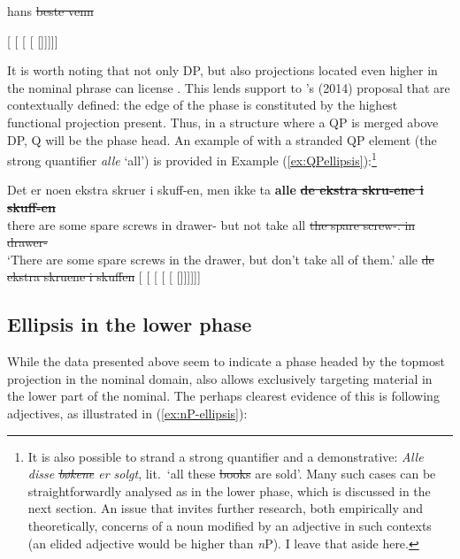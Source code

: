 \documentclass[output=paper]{langsci/langscibook}
\begin{document}
\ea\label{ex:illustDPell}
	hans \sout{beste venn}

	[ [ [ [ []]]]]
\z

\noindent It is worth noting that not only DP, but also projections located
even higher in the nominal phrase can license . This lends support to
\citeauthor{Boskovic2014}'s (2014) proposal that  are contextually
defined: the edge of the phase is constituted by the highest functional
projection present. Thus, in a structure where a QP is merged above DP, Q will
be the phase head. An example of  with a stranded QP element (the
strong quantifier \emph{alle} `all') is provided in Example
(\ref{ex:QPellipsis}):\footnote{It is also possible to strand a strong
    quantifier and a demonstrative: \emph{Alle disse \sout{bøkene} er solgt},
lit.\ `all these \sout{books} are sold'.  Many such cases can be
straightforwardly analysed as  in the lower phase, which is discussed
in the next section. An issue that invites further research, both
empirically and theoretically, concerns  of a noun modified by an
adjective in such contexts (an elided adjective would be higher than
\emph{n}P).  I leave that  aside here.}

\ea\label{ex:QPellipsis} 
    \ea
    \gll Det er noen ekstra skruer i skuff-en, men ikke ta  \textbf{alle}
    \textbf{\sout{de ekstra skru-ene i skuff-en}}\\
	there are some spare screws in drawer-\Def{} but not take all \sout{the spare screw-\Pl.\Def{} in drawer-\Def{}}\\
    \glt `There are some spare screws in the drawer, but don't take all of them.'
    \ex alle \sout{de ekstra skruene i skuffen}
		[ [ [ [ [ []]]]]]
    \z
\z

\subsection{Ellipsis in the lower phase}

While the data presented above seem to indicate a phase headed by the topmost
projection in the nominal domain,  also allows  exclusively
targeting material in the lower part of the nominal. The perhaps clearest
evidence of this is  following adjectives, as illustrated in
(\ref{ex:nP-ellipsis}):
\end{document}

